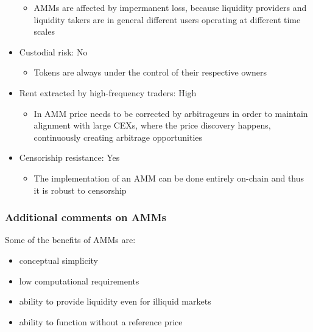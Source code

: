 \documentclass[11pt, reqno]{amsart}
\theoremstyle{definition}
\theoremstyle{remark}
\begin{document}
\begin{itemize}
          \begin{itemize}
              \item AMMs are affected by impermanent loss, because liquidity
                    providers and liquidity takers are in general different users
                    operating at different time scales
          \end{itemize}
    \item Custodial risk: No
          \begin{itemize}
              \item Tokens are always under the control of their respective owners
          \end{itemize}
    \item Rent extracted by high-frequency traders: High
          \begin{itemize}
              \item In AMM price needs to be corrected by arbitrageurs in order
                    to maintain alignment with large CEXs, where the price
                    discovery happens, continuously creating arbitrage opportunities
          \end{itemize}
    \item Censoriship resistance: Yes
          \begin{itemize}
              \item The implementation of an AMM can be done entirely on-chain and thus
                    it is robust to censorship
          \end{itemize}
\end{itemize}


\subsubsection{Additional comments on AMMs}

Some of the benefits of AMMs are:
\begin{itemize}
    \item conceptual simplicity
    \item low computational requirements
    \item ability to provide liquidity even for illiquid markets
    \item ability to function without a reference price
\end{itemize}
\end{document}
